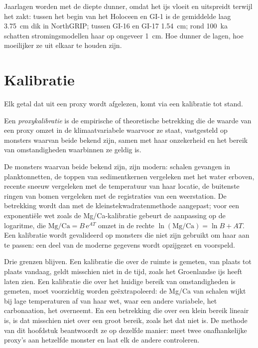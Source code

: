 Jaarlagen worden met de diepte dunner, omdat het ijs vloeit en uitspreidt terwijl het zakt: tussen het begin van
het Holoceen en GI-1 is de gemiddelde laag \qty{3.75}{cm} dik in NorthGRIP; tussen GI-16 en
GI-17 \qty{1.54}{cm}; rond \qty{100}{ka} schatten stromingsmodellen haar op ongeveer \qty{1}{cm}. Hoe dunner de lagen, hoe moeilijker
ze uit elkaar te houden zijn.

\section{Kalibratie}\label{sec:b2:climate-proxies:calibration}

Elk getal dat uit een proxy wordt afgelezen, komt via een kalibratie tot stand.

\begin{definition}[Proxykalibratie]\label{def:b2:climate-proxies:calibration}
Een \emph{proxykalibratie} is de empirische of theoretische betrekking die
de waarde van een proxy omzet in de klimaatvariabele waarvoor ze staat, vastgesteld op monsters waarvan
beide bekend zijn, samen met haar onzekerheid en het bereik van omstandigheden waarbinnen ze
geldig is.
\end{definition}

De monsters waarvan beide bekend zijn, zijn modern: schalen gevangen in planktonnetten, de toppen van sedimentkernen vergeleken met het water erboven, recente sneeuw vergeleken met de
temperatuur van haar locatie, de buitenste ringen van bomen vergeleken met de registraties van een weerstation.
De betrekking wordt dan met de kleinstekwadratenmethode aangepast; voor een exponentiële wet zoals de
Mg/Ca-kalibratie gebeurt de aanpassing op de logaritme, die $\text{Mg/Ca} = B\,\mathrm{e}^{AT}$ omzet in
de rechte $\ln(\text{Mg/Ca}) = \ln B + AT$. Een kalibratie wordt gevalideerd op monsters die
niet zijn gebruikt om haar aan te passen: een deel van de moderne gegevens wordt opzijgezet en voorspeld.

Drie grenzen blijven. Een kalibratie die over de ruimte is gemeten, van plaats tot plaats vandaag, geldt misschien niet
in de tijd, zoals het Groenlandse ijs heeft laten zien. Een kalibratie die over het huidige bereik van omstandigheden is gemeten,
moet voorzichtig worden geëxtrapoleerd: de Mg/Ca van schalen wijkt bij lage temperaturen af van haar wet, waar
een andere variabele, het carbonaation, het overneemt. En een betrekking die over een klein bereik lineair is,
is dat misschien niet over een groot bereik, zoals het  dat niet is. De methode van dit hoofdstuk
beantwoordt ze op dezelfde manier: meet twee onafhankelijke proxy's aan hetzelfde monster en laat elk
de andere controleren.

